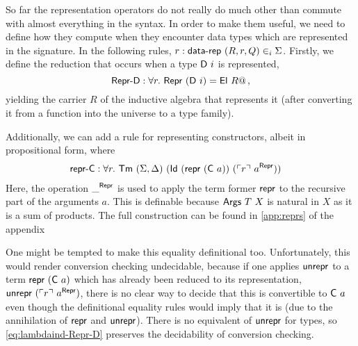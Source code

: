 So far the representation operators do not really do much other than commute
with almost everything in the syntax. In order to make
them useful, we need to define how they compute when they encounter data types
which are represented in the signature.
In the following rules, $r : \textsf{data-rep}\ (R, r, Q) \in_i \Sigma$.
Firstly, we define the reduction that occurs when a type $\textsf{D}\ i$ is represented,
\begin{equation}
  \textsf{Repr-D} : \forall r.\ \textsf{Repr}\ (\textsf{D}\ i) = \textsf{El}\ R@ \,, \label{eq:lambdaind-Repr-D}
\end{equation}
yielding the carrier $R$ of the inductive algebra that represents it (after
converting it from a function into the universe to a type family).

Additionally, we can add a rule for representing constructors, albeit in propositional form, where
\begin{align*}
&\mta{repr-C} : \forall r.\ \Tm\ (\Sigma, \Delta)\ (\mta{Id}\ (\Mrepr\ (\mta{C}\ a))\ (\emb{r}\ a^\mta{Repr}))
\end{align*}
Here, the operation $\_^{\textsf{Repr}}$ is used to apply the term former
$\textsf{repr}$ to the recursive part of the arguments $a$. This is definable
because $\mta{Args}\ T\ X$ is natural in $X$ as it is a sum of products. The
full construction can be found in \cref{app:reprs} of the appendix

One might be tempted to make this equality definitional too. Unfortunately, this
would render conversion checking undecidable, because if one applies
$\textsf{unrepr}$ to a term $\textsf{repr}\ (\textsf{C}\ a)$ which has already been reduced
to its representation, $\textsf{unrepr}\ (\ulcorner r \urcorner\ a^{\textsf{Repr}})$, there is no
clear way to decide that this is convertible to $\textsf{C}\ a$ even though the
definitional equality rules would imply that it is (due
to the annihilation of $\textsf{repr}$ and $\textsf{unrepr}$). There is no
equivalent of $\textsf{unrepr}$ for types, so \eqref{eq:lambdaind-Repr-D} preserves
the decidability of conversion checking.


